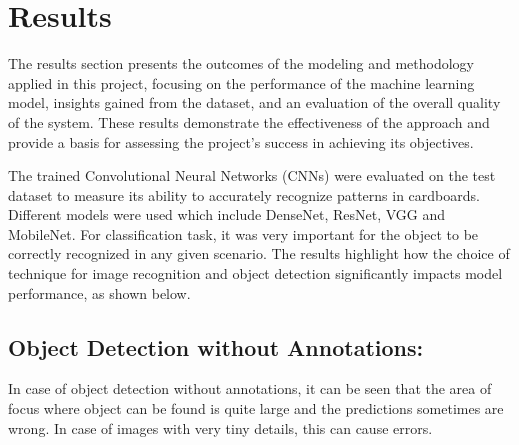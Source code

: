 \renewcommand\lstlistingname{Source Code}
\renewcommand\lstlistlistingname{Source Code}



\chapter{Results}
\label{c:results}
The results section presents the outcomes of the modeling and methodology applied in this project, focusing on the performance of the machine learning model, insights gained from the dataset, and an evaluation of the overall quality of the system. These results demonstrate the effectiveness of the approach and provide a basis for assessing the project's success in achieving its objectives.

The trained Convolutional Neural Networks (CNNs) were evaluated on the test dataset to measure its ability to accurately recognize patterns in cardboards. Different models were used which include DenseNet, ResNet, VGG and MobileNet. For classification task, it was very important for the object to be correctly recognized in any given scenario. The results highlight how the choice of technique for image recognition and object detection significantly impacts model performance, as shown below.

\section{Object Detection without Annotations:}
In case of object detection without annotations, it can be seen that the area of focus where object can be found is quite large and the predictions sometimes are wrong. In case of images with very tiny details, this can cause errors.

